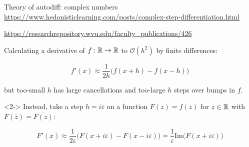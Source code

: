 \documentclass[aspectratio=169]{beamer}
\begin{document}




\begin{frame}{Theory of autodiff: complex numbers}
\vspace{0.3 cm}
{\scriptsize \textcolor{blue}{\url{https://www.hedonisticlearning.com/posts/complex-step-differentiation.html}}}

{\scriptsize \textcolor{blue}{\url{https://researchrepository.wvu.edu/faculty_publications/426}}}

\vspace{0.3 cm}
Calculating a derivative of $f : \Bbb{R} \to \Bbb{R}$ to $\mathcal{O}(h^2)$ by finite differences:

\[ f'(x) \approx \frac{1}{2h} \bigg( f(x + h) - f(x - h) \bigg) \]

but too-small $h$ has large cancellations and too-large $h$ steps over bumps in $f$.

\vspace{0.3 cm}
\begin{uncoverenv}<2->
Instead, take a step $h = i\varepsilon$ on a function $F(z) = f(z)$ for $z \in \Bbb{R}$ with $F(\overline{z}) = \overline{F(z)}$:

\[ F'(x) \approx \frac{1}{2\varepsilon} \bigg( F(x + i\varepsilon) - F(x - i\varepsilon) \bigg) = \frac{1}{\varepsilon} \mbox{Im}\bigg( F(x + i\varepsilon) \bigg) \]
\end{uncoverenv}

\vspace{0.3 cm}
\end{frame}
\end{document}
